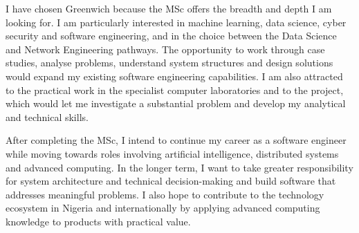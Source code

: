 \documentclass[11pt,a4paper]{article}
\begin{document}
I have chosen Greenwich because the MSc offers the breadth and depth I am looking for. I am particularly interested in machine learning, data science, cyber security and software engineering, and in the choice between the Data Science and Network Engineering pathways. The opportunity to work through case studies, analyse problems, understand system structures and design solutions would expand my existing software engineering capabilities. I am also attracted to the practical work in the specialist computer laboratories and to the project, which would let me investigate a substantial problem and develop my analytical and technical skills.

After completing the MSc, I intend to continue my career as a software engineer while moving towards roles involving artificial intelligence, distributed systems and advanced computing. In the longer term, I want to take greater responsibility for system architecture and technical decision-making and build software that addresses meaningful problems. I also hope to contribute to the technology ecosystem in Nigeria and internationally by applying advanced computing knowledge to products with practical value.
\end{document}
